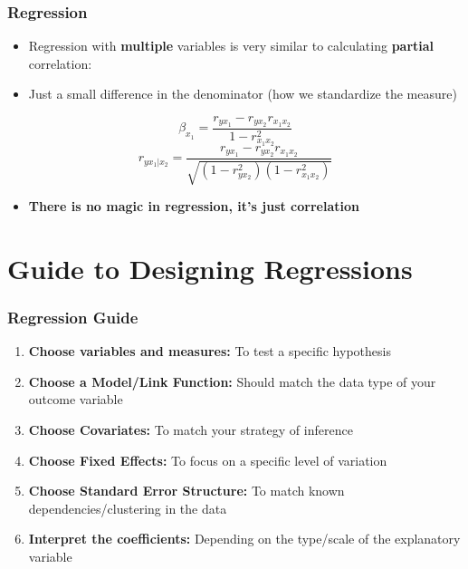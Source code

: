 \documentclass[xcolor=x11names,compress]{beamer}\usepackage[]{graphicx}\usepackage[]{color}
\renewcommand{\(}{\begin{columns}}
\renewcommand{\)}{\end{columns}}
\newcommand{\<}[1]{\begin{column}{#1}}
\renewcommand{\>}{\end{column}}
\begin{document}
\begin{frame}
\frametitle{Regression}
\begin{itemize}
\item Regression with \textbf{multiple} variables is very similar to calculating \textbf{partial} correlation:
\pause
\item Just a small difference in the denominator (how we standardize the measure)
\pause
\end{itemize}
$$\beta_{x_1} = \frac{r_{yx_1} - r_{yx_2}r_{x_1x_2}}{1-r^2_{x_1x_2}}$$
$$r_{yx_1|x_2} = \frac{r_{yx_1} - r_{yx_2}r_{x_1x_2}}{\sqrt{(1-r^2_{yx_2})(1-r^2_{x_1x_2})}}$$
\begin{itemize}
\item \textbf{There is no magic in regression, it's just correlation}
\end{itemize}
\end{frame}

\section{Guide to Designing Regressions}

\begin{frame}
\frametitle{Regression Guide}
\begin{enumerate}
\item \textbf{Choose variables and measures:} To test a specific hypothesis
\item \textbf{Choose a Model/Link Function:} Should match the data type of your outcome variable
\item \textbf{Choose Covariates:} To match your strategy of inference
\item \textbf{Choose Fixed Effects:} To focus on a specific level of variation
\item \textbf{Choose Standard Error Structure:} To match known dependencies/clustering in the data
\item \textbf{Interpret the coefficients:} Depending on the type/scale of the explanatory variable
\end{enumerate}
\end{frame}
\end{document}
